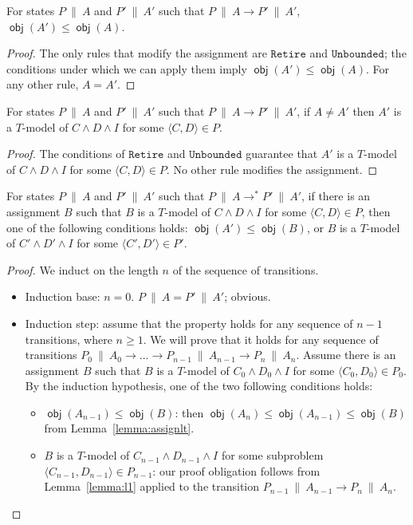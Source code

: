 \documentclass{llncs}
\newcommand{\tr}[1]{\ensuremath{\mathtt{#1}}}
\newcommand{\state}[2]{\ensuremath{#1\ \|\ #2}}
\newcommand{\subp}[2]{\ensuremath{\langle#1, #2\rangle}}
\newcommand{\trans}[0]{\ensuremath{ \longrightarrow }}
\newcommand{\transstar}[0]{\ensuremath{ \longrightarrow^{*} }}
\newcommand{\cd}{\subp{C}{D}}
\newcommand{\cdprime}{\subp{C'}{D'}}
\newcommand{\pa}{\state{P}{A}}
\newcommand{\paprime}{\state{P'}{A'}}
\newcommand{\obj}[1]{\ensuremath{\operatorname{\mathsf{obj}}(#1)}}
\begin{document}
\begin{lemma}
  \label{lemma:assignlt}
  For states {\pa} and {\paprime} such that $\pa \trans \paprime$,
  $\obj{A'} \leq \obj{A}$.
\end{lemma}
\begin{proof}
  The only rules that modify the assignment are \tr{Retire} and
  \tr{Unbounded}; the conditions under which we can apply them imply
  $\obj{A'} \leq \obj{A}$.  For any other rule, $A = A'$.
\end{proof}

\begin{lemma}
  \label{lemma:assigndiff}
  For states {\pa} and {\paprime} such that $\pa \trans \paprime$, if
  $A \neq A'$ then $A'$ is a $T$-model of $C \wedge D \wedge I$ for
  some $\cd{} \in P$.
\end{lemma}
\begin{proof}
  The conditions of \tr{Retire} and \tr{Unbounded} guarantee that $A'$
  is a $T$-model of $C \wedge D \wedge I$ for some $\cd \in P$. No
  other rule modifies the assignment.
\end{proof}

\begin{lemma}
  \label{lemma:l2}
  For states {\pa} and {\paprime} such that $\pa \transstar \paprime$,
  if there is an assignment $B$ such that $B$ is a $T$-model of $C
  \wedge D \wedge I$ for some $\cd \in P$, then one of the following
  conditions holds: $\obj{A'} \leq \obj{B}$, or $B$ is a $T$-model of
  $C' \wedge D' \wedge I$ for some $\cdprime \in P'$.
\end{lemma}
\begin{proof}
  We induct on the length $n$ of the sequence of transitions.

  \begin{itemize}
  \item Induction base: $n = 0$. $\pa = \paprime$; obvious.
  \item Induction step: assume that the property holds for any
    sequence of $n - 1$ transitions, where $n \geq 1$. We will prove
    that it holds for any sequence of transitions $\state{P_0}{A_0}
    \trans ... \trans \state{P_{n-1}}{A_{n-1}} \trans
    \state{P_n}{A_n}$.  Assume there is an assignment $B$ such that
    $B$ is a $T$-model of $C_0 \wedge D_0 \wedge I$ for some
    $\subp{C_0}{D_0} \in P_0$. By the induction hypothesis, one of the
    two following conditions holds:
    \begin{itemize}
    \item $\obj{A_{n - 1}} \leq \obj{B}$: then $\obj{A_n} \leq
      \obj{A_{n - 1}} \leq \obj{B}$ from
      Lemma~\ref{lemma:assignlt}.
    \item $B$ is a $T$-model of $C_{n - 1} \wedge D_{n - 1} \wedge I$
      for some subproblem $\subp{C_{n - 1}}{D_{n - 1}} \in P_{n - 1}$:
      our proof obligation follows from Lemma~\ref{lemma:l1} applied
      to the transition $\state{P_{n-1}}{A_{n-1}} \trans
      \state{P_n}{A_n}$.
    \end{itemize}
  \end{itemize}

\end{proof}
\end{document}
